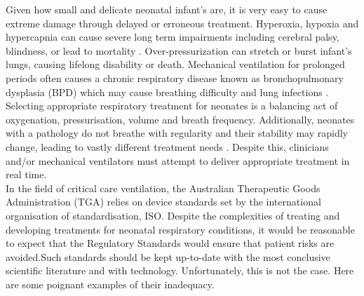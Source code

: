 \documentclass[12pt, openany, oneside]{book}
\begin{document}
Given how small and delicate neonatal infant's are, it is very easy to cause extreme damage through delayed or erroneous treatment. Hyperoxia, hypoxia and hypercapnia can cause severe long term impairments including cerebral palsy, blindness, or lead to mortality \cite{wall2009neonatal, hankins2003defining}. Over-pressurization can stretch or burst  infant's lungs, causing lifelong disability or death. Mechanical ventilation for prolonged periods often causes a chronic respiratory disease known as bronchopulmonary dysplasia (BPD) which may cause breathing difficulty and lung infections \citep{edwards2013}. Selecting appropriate respiratory treatment for neonates is a balancing act of oxygenation, pressurisation, volume and breath frequency. Additionally, neonates with a pathology do not breathe with regularity and their stability may rapidly change, leading to vastly different treatment needs \citep{burri1984fetal, morley2008advances, miedema2011changes, lanteri1993changes}.  Despite this, clinicians and/or mechanical ventilators must attempt to deliver appropriate treatment in real time. \\

In the field of critical care ventilation, the Australian Therapeutic Goods Administration (TGA) relies on device standards set by the international organisation of standardisation, ISO. Despite the complexities of treating and developing treatments for neonatal respiratory conditions, it would be reasonable to expect that the Regulatory Standards would ensure that patient risks are avoided.Such standards should be kept up-to-date with the most conclusive scientific literature and with technology. Unfortunately, this is not the case. Here are some poignant examples of their inadequacy.
\end{document}

